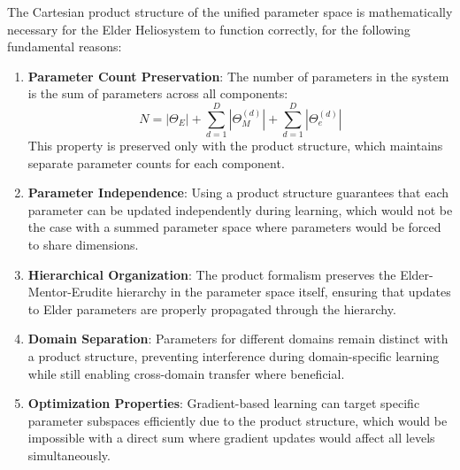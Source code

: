\begin{theorem}
\label{thm:cartesian_product_necessity}
The Cartesian product structure of the unified parameter space is mathematically necessary for the Elder Heliosystem to function correctly, for the following fundamental reasons:
\begin{enumerate}
    \item \textbf{Parameter Count Preservation}: The number of parameters in the system is the sum of parameters across all components:
    \begin{equation}
    N = |\Theta_E| + \sum_{d=1}^D |\Theta_M^{(d)}| + \sum_{d=1}^D |\Theta_e^{(d)}|
    \end{equation}
    This property is preserved only with the product structure, which maintains separate parameter counts for each component.
    
    \item \textbf{Parameter Independence}: Using a product structure guarantees that each parameter can be updated independently during learning, which would not be the case with a summed parameter space where parameters would be forced to share dimensions.
    
    \item \textbf{Hierarchical Organization}: The product formalism preserves the Elder-Mentor-Erudite hierarchy in the parameter space itself, ensuring that updates to Elder parameters are properly propagated through the hierarchy.
    
    \item \textbf{Domain Separation}: Parameters for different domains remain distinct with a product structure, preventing interference during domain-specific learning while still enabling cross-domain transfer where beneficial.
    
    \item \textbf{Optimization Properties}: Gradient-based learning can target specific parameter subspaces efficiently due to the product structure, which would be impossible with a direct sum where gradient updates would affect all levels simultaneously.
\end{enumerate}
\end{theorem}

